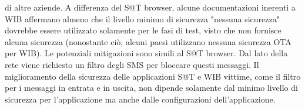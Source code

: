 \documentclass[12pt]{report}
\begin{document}
\begin{appendix}
di altre aziende. A differenza del S@T browser, alcune documentazioni inerenti a WIB affermano almeno che il livello minimo di sicurezza "nessuna sicurezza" dovrebbe essere utilizzato solamente per le fasi di test, visto che non fornisce alcuna sicurezza (nonostante ciò, alcuni paesi utilizzano nessuna sicurezza OTA per WIB). Le potenziali mitigazioni sono simili al S@T browser. Dal lato della rete viene richiesto un filtro degli SMS per bloccare questi messaggi. Il miglioramento della sicurezza delle applicazioni S@T e WIB vittime, come il filtro per i messaggi in entrata e in uscita, non dipende solamente dal minimo livello di sicurezza per l'applicazione ma anche dalle configurazioni dell'applicazione.
\end{appendix}
\end{document}
